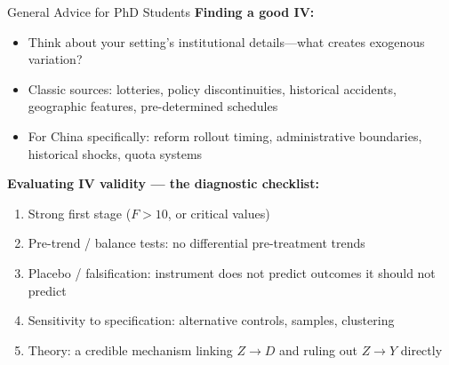 \documentclass{beamer}
\begin{document}
\begin{frame}{General Advice for PhD Students}
\textbf{Finding a good IV:}
\begin{itemize}
  \item Think about your setting's institutional details---what creates
        exogenous variation?
  \item Classic sources: lotteries, policy discontinuities, historical
        accidents, geographic features, pre-determined schedules
  \item For China specifically: reform rollout timing, administrative
        boundaries, historical shocks, quota systems
\end{itemize}

\medskip
\textbf{Evaluating IV validity --- the diagnostic checklist:}
\begin{enumerate}
  \item Strong first stage ($F>10$, or  critical values)
  \item Pre-trend / balance tests: no differential pre-treatment trends
  \item Placebo / falsification: instrument does not predict outcomes it
        should not predict
  \item Sensitivity to specification: alternative controls, samples,
        clustering
  \item Theory: a credible mechanism linking $Z\to D$ and ruling out
        $Z\to Y$ directly
\end{enumerate}
\end{frame}
\end{document}
